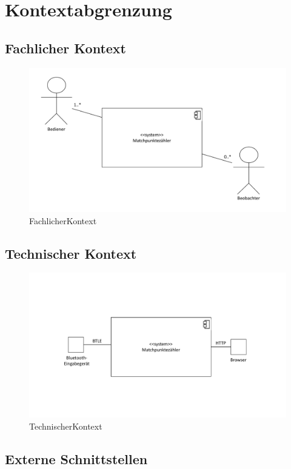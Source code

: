 \chapter{Kontextabgrenzung}

\section{Fachlicher Kontext}
\begin{figure}[H]
\begin{center}
\includegraphics[scale=0.5]{Grafiken/FachlicherKontext.pdf}
\caption{FachlicherKontext}
\end{center}
\end{figure}
\section{Technischer Kontext}
\begin{figure}[H]
\begin{center}
\includegraphics[scale=0.5]{Grafiken/TechnischerKontext.pdf}
\caption{TechnischerKontext}
\end{center}
\end{figure}
\section{Externe Schnittstellen}